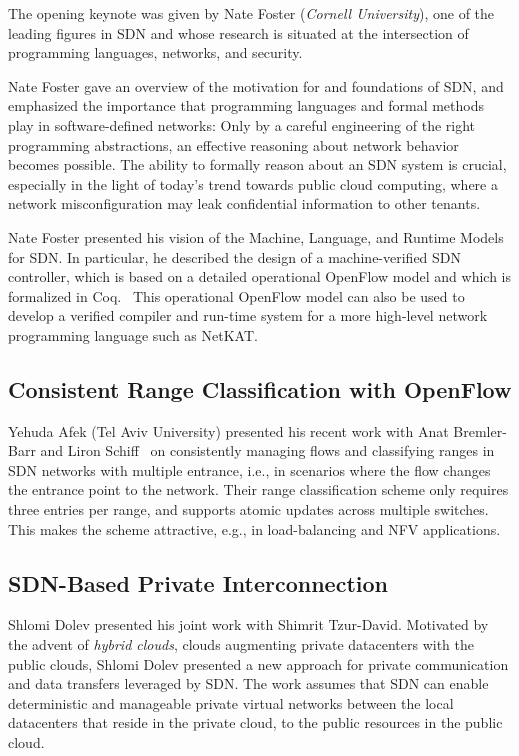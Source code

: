 \documentclass[11pt,pdftex,letter]{article}
\begin{document}
The opening keynote was given by Nate Foster (\emph{Cornell University}),
one of the leading figures in SDN and whose research
is situated at the intersection of programming languages, networks, and security.

Nate Foster gave an overview of the motivation for and foundations of SDN, and
emphasized the importance that programming languages and formal methods
play in software-defined networks: Only by a careful engineering of the right programming abstractions,
an effective reasoning about network behavior becomes possible. The ability to
formally reason about an SDN system is crucial, especially in the light
of today's trend towards public cloud computing, where a network misconfiguration may
leak confidential information to other tenants.

Nate Foster presented his vision of the Machine, Language, and Runtime Models for SDN.
In particular, he described the design of a machine-verified SDN controller,
which is based on a detailed operational OpenFlow model
and which is formalized in Coq.~\cite{machine-verified}
This operational OpenFlow model can also be used
to develop a verified compiler and run-time system
for a more high-level network programming language such as NetKAT.~\cite{netkat}


\subsection{Consistent Range Classification with OpenFlow}

Yehuda Afek (Tel Aviv University) presented his recent work with Anat Bremler-Barr and
Liron Schiff~\cite{AfekBS14} on consistently managing flows and classifying ranges
in SDN networks with multiple entrance, i.e., in scenarios where the flow changes the entrance point
to the network.
Their range classification scheme only requires three entries per range,
and supports atomic updates across multiple switches. This makes the scheme attractive,
e.g., in load-balancing and NFV applications.


\subsection{SDN-Based Private Interconnection}

Shlomi Dolev presented his joint work with Shimrit Tzur-David. 
Motivated by the advent of \emph{hybrid clouds}, clouds augmenting 
private datacenters with the public clouds, Shlomi Dolev
presented a new approach for private communication and data transfers
leveraged by SDN. The work assumes that SDN can enable deterministic and manageable private virtual
networks between the local datacenters that reside in the private cloud, to the public resources in the public cloud. 
\end{document}
